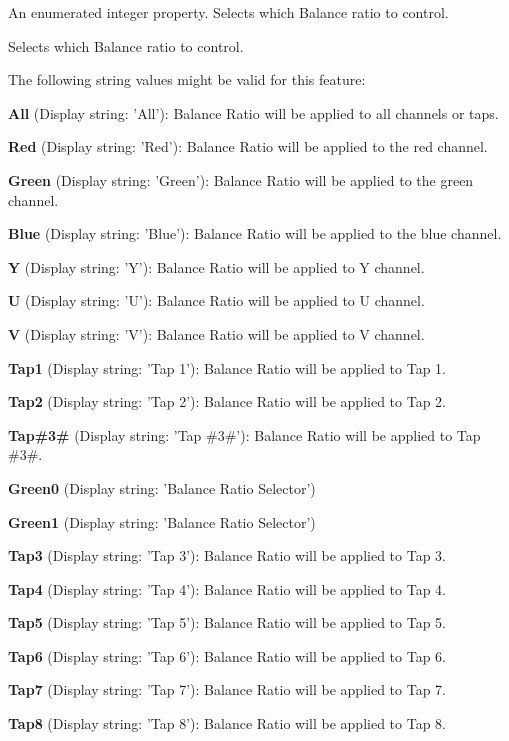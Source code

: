 An enumerated integer property. Selects which Balance ratio to control. 

Selects which Balance ratio to control.

The following string values might be valid for this feature\+:
\begin{DoxyItemize}
\item {\bfseries All} (Display string\+: 'All')\+: Balance Ratio will be applied to all channels or taps.
\item {\bfseries Red} (Display string\+: 'Red')\+: Balance Ratio will be applied to the red channel.
\item {\bfseries Green} (Display string\+: 'Green')\+: Balance Ratio will be applied to the green channel.
\item {\bfseries Blue} (Display string\+: 'Blue')\+: Balance Ratio will be applied to the blue channel.
\item {\bfseries Y} (Display string\+: 'Y')\+: Balance Ratio will be applied to Y channel.
\item {\bfseries U} (Display string\+: 'U')\+: Balance Ratio will be applied to U channel.
\item {\bfseries V} (Display string\+: 'V')\+: Balance Ratio will be applied to V channel.
\item {\bfseries Tap1} (Display string\+: 'Tap 1')\+: Balance Ratio will be applied to Tap 1.
\item {\bfseries Tap2} (Display string\+: 'Tap 2')\+: Balance Ratio will be applied to Tap 2.
\item {\bfseries Tap\#3\#} (Display string\+: 'Tap \#3\#')\+: Balance Ratio will be applied to Tap \#3\#.
\item {\bfseries Green0} (Display string\+: 'Balance Ratio Selector')
\item {\bfseries Green1} (Display string\+: 'Balance Ratio Selector')
\item {\bfseries Tap3} (Display string\+: 'Tap 3')\+: Balance Ratio will be applied to Tap 3.
\item {\bfseries Tap4} (Display string\+: 'Tap 4')\+: Balance Ratio will be applied to Tap 4.
\item {\bfseries Tap5} (Display string\+: 'Tap 5')\+: Balance Ratio will be applied to Tap 5.
\item {\bfseries Tap6} (Display string\+: 'Tap 6')\+: Balance Ratio will be applied to Tap 6.
\item {\bfseries Tap7} (Display string\+: 'Tap 7')\+: Balance Ratio will be applied to Tap 7.
\item {\bfseries Tap8} (Display string\+: 'Tap 8')\+: Balance Ratio will be applied to Tap 8.

\end{DoxyItemize}
